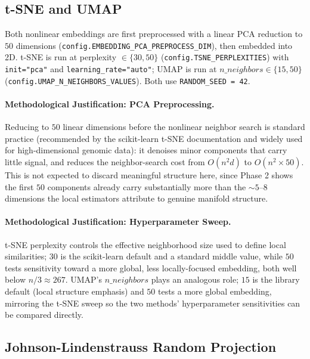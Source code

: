 \documentclass[11pt]{article}
\begin{document}
\subsection{t-SNE and UMAP}

Both nonlinear embeddings are first preprocessed with a linear PCA
reduction to $50$ dimensions (\texttt{config.EMBEDDING\_PCA\_PREPROCESS\_DIM}),
then embedded into 2D. t-SNE is run at perplexity $\in \{30, 50\}$
(\texttt{config.TSNE\_PERPLEXITIES}) with \texttt{init="pca"} and
\texttt{learning\_rate="auto"}; UMAP is run at $n\_neighbors \in \{15, 50\}$
(\texttt{config.UMAP\_N\_NEIGHBORS\_VALUES}). Both use
\texttt{RANDOM\_SEED = 42}.

\paragraph{Methodological Justification: PCA Preprocessing.} Reducing to
$50$ linear dimensions before the nonlinear neighbor search is standard
practice (recommended by the scikit-learn t-SNE documentation and widely
used for high-dimensional genomic data): it denoises minor components that
carry little signal, and reduces the neighbor-search cost from
$O(n^2 d)$ to $O(n^2 \times 50)$. This is not expected to discard
meaningful structure here, since Phase 2 shows the first $50$ components
already carry substantially more than the $\sim 5$--$8$ dimensions the
local estimators attribute to genuine manifold structure.

\paragraph{Methodological Justification: Hyperparameter Sweep.} t-SNE
perplexity controls the effective neighborhood size used to define local
similarities; $30$ is the scikit-learn default and a standard middle value,
while $50$ tests sensitivity toward a more global, less locally-focused
embedding, both well below $n/3 \approx 267$. UMAP's $n\_neighbors$ plays an
analogous role; $15$ is the library default (local structure emphasis) and
$50$ tests a more global embedding, mirroring the t-SNE sweep so the two
methods' hyperparameter sensitivities can be compared directly.

\subsection{Johnson-Lindenstrauss Random Projection}
\end{document}
